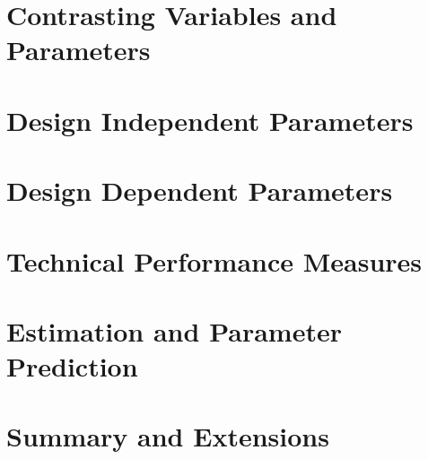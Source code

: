 

\section{Contrasting Variables and Parameters}


\section{Design Independent Parameters}


\section{Design Dependent Parameters}


\section{Technical Performance Measures}


\section{Estimation and Parameter Prediction}


\section{Summary and Extensions}


